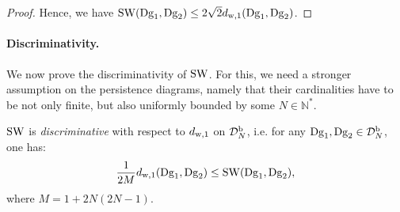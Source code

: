 \begin{proof}
Hence, we have
${\rm SW}(\mathrm{Dg}_1,\mathrm{Dg}_2)\leq 2\sqrt{2}d_{{\rm w},1}(\mathrm{Dg}_1,\mathrm{Dg}_2)$.
\end{proof}







\paragraph*{Discriminativity.}
We now prove the discriminativity of ${\rm SW}$.
For this, we need a stronger assumption on the persistence diagrams, namely that their cardinalities have to be not only finite, but also 
uniformly bounded by some $N\in\mathbb{N}^*$.

\begin{thm}\label{th:discr}
${\rm SW}$  is {\em discriminative} with respect to $d_{{\rm w},1}$ on ${\mathcal D}_N^{\rm b}$, i.e.
for any $\mathrm{Dg}_1,\mathrm{Dg}_2\in{\mathcal D}_N^{\rm b}$, one has: $$\frac{1}{2M}d_{{\rm w},1}(\mathrm{Dg}_1,\mathrm{Dg}_2)\leq {\rm SW}(\mathrm{Dg}_1,\mathrm{Dg}_2),$$
where $M=1+2N(2N-1)$. 
\end{thm}


